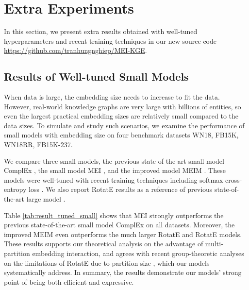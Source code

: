\documentclass{ecai}
\theoremstyle{plain}  \newtheorem{thm}{Theorem}  \newtheorem{lem}[thm]{Lemma}  \newtheorem{prop}[thm]{Proposition}
\theoremstyle{remark}  \newtheorem*{rem}{Remark}
\begin{document}
\clearpage
\appendix

\section{Extra Experiments}
In this section, we present extra results obtained with well-tuned hyperparameters and recent training techniques in our new source code \url{https://github.com/tranhungnghiep/MEI-KGE}.

\subsection{Results of Well-tuned Small Models}
When data is large, the embedding size needs to increase to fit the data. However, real-world knowledge graphs are very large with billions of entities, so even the largest practical embedding sizes are relatively small compared to the data sizes. To simulate and study such scenarios, we examine the performance of small models with embedding size  on four benchmark datasets WN18, FB15K, WN18RR, FB15K-237.

We compare three small models, the previous state-of-the-art small model ComplEx \cite{lacroix_canonicaltensordecomposition_2018}, the small model MEI \cite{tran_multipartitionembeddinginteraction_2020}, and the improved model MEIM \cite{tran_meimmultipartitionembedding_2022}. These models were well-tuned with recent training techniques including softmax cross-entropy loss \cite{dettmers_convolutional2dknowledge_2018} \cite{lacroix_canonicaltensordecomposition_2018} \cite{ruffinelli_youcanteach_2020}. We also report RotatE results as a reference of previous state-of-the-art large model \cite{sun_rotateknowledgegraph_2019}.

Table \ref{tab:result_tuned_small} shows that MEI strongly outperforms the previous state-of-the-art small model ComplEx on all datasets. Moreover, the improved MEIM even outperforms the much larger RotatE and RotatE models. These results supports our theoretical analysis on the advantage of multi-partition embedding interaction, and agrees with recent group-theoretic analyses \cite{cai_grouprepresentationtheory_2019} on the limitations of RotatE due to partition size , which our models systematically address. In summary, the results demonstrate our models' strong point of being both efficient and expressive.
\end{document}
